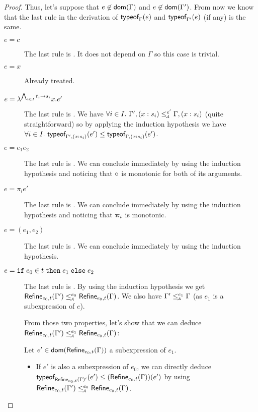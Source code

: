 \documentclass[a4paper]{article}
\theoremstyle{definition}
\begin{document}
\begin{proof}
  Thus, let's suppose that $e\not\in\dom\Gamma$ and $e\not\in\dom{\Gamma'}$.
  From now we know that the last rule in the derivation of $\tyof e {\Gamma}$ and $\tyof e {\Gamma'}$ (if any) is the same.

  \begin{description}
    \item[$e=c$] The last rule is . It does not depend on $\Gamma$ so this case is trivial.
    \item[$e=x$] Already treated.
    \item[$e=\lambda^{\bigwedge_{i\in I} \arrow {t_i}{s_i}}x.e'$]
    The last rule is .
    We have $\forall i\in I.\ \Gamma', (x:s_i) \leqA^{e'} \Gamma, (x:s_i)$ (quite straightforward)
    so by applying the induction hypothesis we have $\forall i\in I.\ \tyof {e'} {\Gamma', (x:s_i)} \leq \tyof {e'} {\Gamma, (x:s_i)}$.

    \item[$e=e_1 e_2$] The last rule is .
    We can conclude immediately by using the induction hypothesis and noticing that $\apply {} {}$ is monotonic for both of its arguments.

    \item[$e=\pi_i e'$] The last rule is .
    We can conclude immediately by using the induction hypothesis and noticing that $\bpi_i$ is monotonic.
     
    \item[$e=(e_1,e_2)$] The last rule is .
    We can conclude immediately by using the induction hypothesis.

    \item[$e=\ite {e_0} t {e_1} {e_2}$] The last rule is .
    By using the induction hypothesis we get $\Refine {e_0,t} {\Gamma'} \leqA^{e_0} \Refine {e_0,t} \Gamma$.
    We also have $\Gamma' \leqA^{e_1} \Gamma$ (as $e_1$ is a subexpression of $e$).

    From those two properties, let's show that we can deduce $\Refine {e_0,t} {\Gamma'} \leqA^{e_1} \Refine {e_0,t} \Gamma$:

    Let $e'\in\dom{\Refine {e_0,t} \Gamma}$ a subexpression of $e_1$.
    \begin{itemize}
      \item If $e'$ is also a subexpression of $e_0$, we can directly deduce
      $\tyof {e'} {\Refine {e_0,t} \Gamma'} \leq (\Refine {e_0,t} \Gamma) (e')$
      by using $\Refine {e_0,t} {\Gamma'} \leqA^{e_0} \Refine {e_0,t} \Gamma$.


\end{itemize}
\end{description}
\end{proof}
\end{document}
